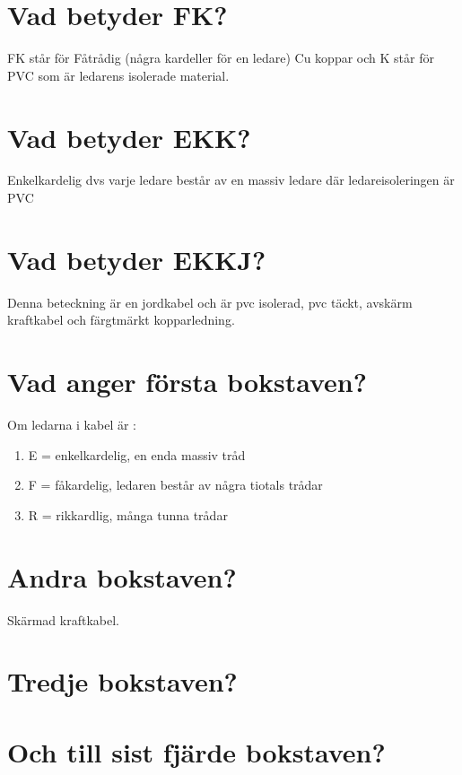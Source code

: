 \documentclass[a4paper,swedish]{article}
\begin{document}
\section{Vad betyder FK?}
\label{sec:q_m_14}

FK står för Fåtrådig (några kardeller för en ledare) Cu koppar och K står för PVC som är ledarens isolerade material.

\section{Vad betyder EKK?}

Enkelkardelig dvs varje ledare består av en massiv ledare där ledareisoleringen är PVC

\section{Vad betyder EKKJ?}
\label{sec:q_m_16}

Denna beteckning är en jordkabel och är pvc isolerad, pvc täckt, avskärm kraftkabel och färgtmärkt kopparledning.

\section{Vad anger första bokstaven?}

Om ledarna i kabel är :
\begin{enumerate}
\item E = enkelkardelig, en enda massiv tråd
\item F = fåkardelig, ledaren består av några tiotals trådar
\item R = rikkardlig, många tunna trådar
\end{enumerate}

\section{Andra bokstaven?}
\label{sec:q_m_18}

Skärmad kraftkabel.

\section{Tredje bokstaven?}


\section{Och till sist fjärde bokstaven?}
\label{sec:q_m_20}
\end{document}
